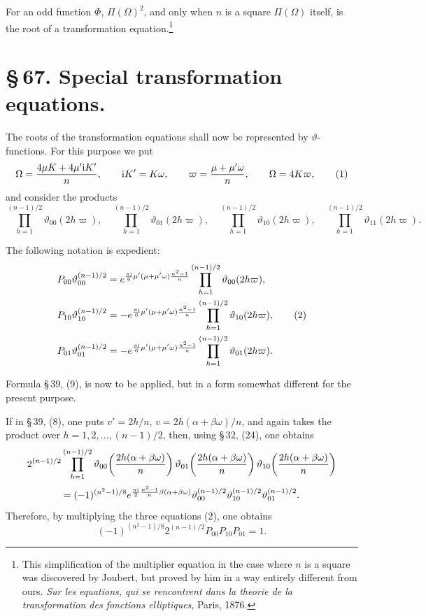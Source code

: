 \documentclass[11pt]{article}
\providecommand{\ii}{\mathrm{i}}
\begin{document}
For an odd function $\Phi$, $\Pi(\Omega)^2$, and only when $n$ is a square $\Pi(\Omega)$ itself, is the root of a transformation equation.\footnote{This simplification of the multiplier equation in the case where $n$ is a square was discovered by Joubert, but proved by him in a way entirely different from ours. \emph{Sur les equations, qui se rencontrent dans la theorie de la transformation des fonctions elliptiques}, Paris, 1876.}

\section*{\S\,67. Special transformation equations.}

The roots of the transformation equations shall now be represented by $\vartheta$-functions. For this purpose we put
\begin{equation}
\Omega={4\mu K+4\mu'\ii K'\over n},\qquad \ii K'=K\omega,
\qquad
\varpi={\mu+\mu'\omega\over n},\qquad \Omega=4K\varpi,
\tag{1}
\end{equation}
and consider the products
\[
\prod_{h=1}^{(n-1)/2}\vartheta_{00}(2h\varpi),\quad
\prod_{h=1}^{(n-1)/2}\vartheta_{01}(2h\varpi),\quad
\prod_{h=1}^{(n-1)/2}\vartheta_{10}(2h\varpi),\quad
\prod_{h=1}^{(n-1)/2}\vartheta_{11}(2h\varpi).
\]

The following notation is expedient:
\begin{align}
P_{00}\vartheta_{00}^{(n-1)/2}
&=e^{{\pi\ii\over6}\mu'(\mu+\mu'\omega){n^2-1\over n}}
  \prod_{h=1}^{(n-1)/2}\vartheta_{00}(2h\varpi),\notag\\
P_{10}\vartheta_{10}^{(n-1)/2}
&=-e^{{\pi\ii\over6}\mu'(\mu+\mu'\omega){n^2-1\over n}}
  \prod_{h=1}^{(n-1)/2}\vartheta_{10}(2h\varpi),\tag{2}\\
P_{01}\vartheta_{01}^{(n-1)/2}
&=-e^{{\pi\ii\over6}\mu'(\mu+\mu'\omega){n^2-1\over n}}
  \prod_{h=1}^{(n-1)/2}\vartheta_{01}(2h\varpi).\notag
\end{align}

Formula \S\,39, (9), is now to be applied, but in a form somewhat different for the present purpose.

If in \S\,39, (8), one puts $v'=2h/n$, $v=2h(\alpha+\beta\omega)/n$, and again takes the product over $h=1,2,\ldots,(n-1)/2$, then, using \S\,32, (24), one obtains
\[
2^{(n-1)/2}\prod_{h=1}^{(n-1)/2}
\vartheta_{00}\!\left({2h(\alpha+\beta\omega)\over n}\right)
\vartheta_{01}\!\left({2h(\alpha+\beta\omega)\over n}\right)
\vartheta_{10}\!\left({2h(\alpha+\beta\omega)\over n}\right)
\]
\[
=(-1)^{(n^2-1)/8}e^{{\pi\ii\over2}{n^2-1\over n}\beta(\alpha+\beta\omega)}
\vartheta_{00}^{(n-1)/2}\vartheta_{10}^{(n-1)/2}\vartheta_{01}^{(n-1)/2}.
\]
Therefore, by multiplying the three equations (2), one obtains
\begin{equation}
(-1)^{(n^2-1)/8}2^{(n-1)/2}P_{00}P_{10}P_{01}=1.
\tag{3}
\end{equation}
\end{document}
